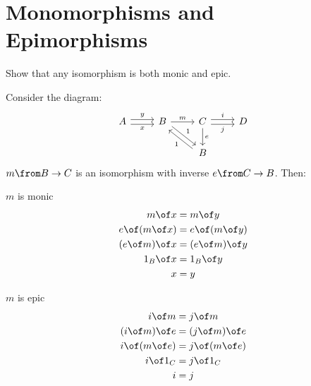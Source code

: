 \section{Monomorphisms and Epimorphisms}


\begin{exercise}
Show that any isomorphism is both monic and epic.
\end{exercise}

\begin{answer}
  Consider the diagram:
  \[
    \begin{tikzcd}
      A \arrow[r,shift left, "y"] \arrow[r,shift right,swap,"x"] &
      B \arrow[dr, shift left, "1"]  \arrow{r}{m}  &
      C \arrow{d}{e} \arrow[r,shift left, "i"] \arrow[r,shift right,swap,"j"] & D\\
     &  & B \arrow[ul, shift left, "1"]&
    \end{tikzcd}
  \]
  $m \from B \to C$ is an isomorphism with inverse $e \from C \to B$.
  Then:\\
  \begin{minipage}{.5\linewidth}
    \vspace{4mm}
    \centering $m$ is monic
    \[
      \begin{aligned}
        m \of x &= m \of y\\
        e \of (m \of x) &= e \of (m \of y)\\
        (e \of m) \of x &= (e \of m) \of y\\
        1_B \of x &= 1_B \of y\\
        x &= y
      \end{aligned}
    \]
  \end{minipage}%
  \begin{minipage}{.5\linewidth}
    \vspace{4mm}
    \centering $m$ is epic
    \[
      \begin{aligned}
        i \of m &= j \of m \\
        (i \of m) \of e &= (j \of m) \of e\\
        i \of (m \of e) &= j \of (m \of e)\\
        i \of 1_C &= j \of 1_C\\
        i &= j
      \end{aligned}
    \]

  \end{minipage}%
\end{answer}

\exercisesOnly{\newpage}

